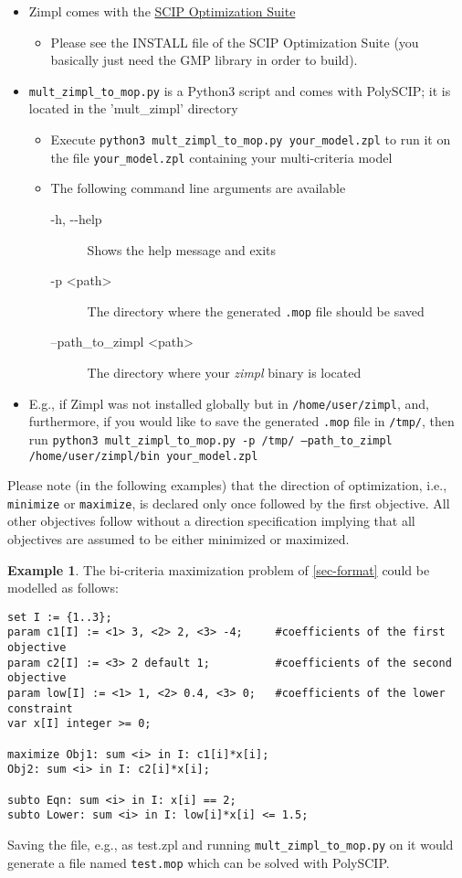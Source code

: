 \documentclass[11pt,listof=totoc]{scrartcl}
\theoremstyle{definition}
\newtheorem{ex}{Example}[section]
\begin{document}
\begin{itemize}
\item Zimpl comes with the \href{http://scip.zib.de/#scipoptsuite}{SCIP Optimization Suite}
\begin{itemize}
\item Please see the INSTALL file of the SCIP Optimization Suite (you
  basically just need the GMP library in order to build).
\end{itemize}
\item \texttt{mult\_zimpl\_to\_mop.py} is a Python3 script and comes with PolySCIP; it is located in the 'mult\_zimpl' directory
\begin{itemize}
\item Execute \texttt{python3 mult\_zimpl\_to\_mop.py your\_model.zpl} to run it on the file \texttt{your\_model.zpl} containing your multi-criteria model
\item The following command line arguments are available
\begin{description}
\item[-h, -{}-help] Shows the help message and exits
\item[-p <path>] The directory where the generated \texttt{.mop} file should be saved
\item[--path\_to\_zimpl <path>] The directory where your \emph{zimpl} binary is located
\end{description}
\end{itemize}
\item[] E.g., if Zimpl was not installed globally but in
  \texttt{/home/user/zimpl}, and, furthermore, if you would like to save
  the generated \texttt{.mop} file in \texttt{/tmp/}, then run
  \texttt{python3 mult\_zimpl\_to\_mop.py -p /tmp/ --path\_to\_zimpl
    /home/user/zimpl/bin your\_model.zpl}
\end{itemize}

Please note (in the following examples) that the direction of optimization,
i.e., \texttt{minimize} or \texttt{maximize}, is declared only once
followed by the first objective. All other objectives follow without a
direction specification implying that all objectives are assumed to be
either minimized or maximized.

\begin{ex}
The bi-criteria maximization problem of \cref{sec-format} could be modelled as follows:
\begin{verbatim}
set I := {1..3};
param c1[I] := <1> 3, <2> 2, <3> -4;     #coefficients of the first objective
param c2[I] := <3> 2 default 1;          #coefficients of the second objective 
param low[I] := <1> 1, <2> 0.4, <3> 0;   #coefficients of the lower constraint
var x[I] integer >= 0;

maximize Obj1: sum <i> in I: c1[i]*x[i];
Obj2: sum <i> in I: c2[i]*x[i];

subto Eqn: sum <i> in I: x[i] == 2;
subto Lower: sum <i> in I: low[i]*x[i] <= 1.5;
\end{verbatim}
Saving the file, e.g., as test.zpl and running \texttt{mult\_zimpl\_to\_mop.py} on it would generate a file named \texttt{test.mop} which can be solved with PolySCIP. 
\end{ex}
\end{document}
